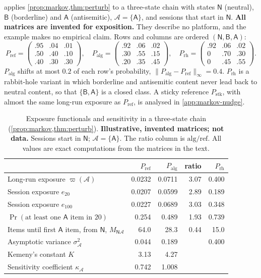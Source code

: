  applies \cref{prop:markov,thm:perturb} to a three-state chain with states $\mathsf N$ (neutral), $\mathsf B$ (borderline) and $\mathsf A$ (antisemitic), $\mathcal A=\{\mathsf A\}$, and sessions that start in $\mathsf N$. \textbf{All matrices are invented for exposition.} They describe no platform, and the example makes no empirical claim. Rows and columns are ordered $(\mathsf N,\mathsf B,\mathsf A)$:
\[
  P_{\mathrm{ref}}=\begin{pmatrix}.95&.04&.01\\.50&.40&.10\\.40&.30&.30\end{pmatrix},\quad
  P_{\mathrm{alg}}=\begin{pmatrix}.92&.06&.02\\.30&.55&.15\\.20&.35&.45\end{pmatrix},\quad
  P_{\mathrm{rh}}=\begin{pmatrix}.92&.06&.02\\0&.70&.30\\0&.45&.55\end{pmatrix}.
\]
$P_{\mathrm{alg}}$ shifts at most $0.2$ of each row's probability, $\|P_{\mathrm{alg}}-P_{\mathrm{ref}}\|_\infty=0.4$. $P_{\mathrm{rh}}$ is a rabbit-hole variant in which borderline and antisemitic content never lead back to neutral content, so that $\{\mathsf B,\mathsf A\}$ is a closed class. A sticky reference $P_{\mathrm{stk}}$, with almost the same long-run exposure as $P_{\mathrm{ref}}$, is analysed in \cref{app:markov-nudge}.

\begin{table}[!htb]
\centering
\caption{Exposure functionals and sensitivity in a three-state chain (\cref{prop:markov,thm:perturb}). \textbf{Illustrative, invented matrices; not data.} Sessions start in $\mathsf N$; $\mathcal A=\{\mathsf A\}$. The ratio column is $\mathrm{alg}/\mathrm{ref}$. All values are exact computations from the matrices in the text.}\label{tab:markov-illus}
\small
\begin{tabular}{@{}l rrr r@{}}
\toprule
 & $P_{\mathrm{ref}}$ & $P_{\mathrm{alg}}$ & ratio & $P_{\mathrm{rh}}$\\
\midrule
Long-run exposure $\varpi(\mathcal A)$ & 0.0232 & 0.0711 & 3.07 & 0.400\\
Session exposure $e_{20}$ & 0.0207 & 0.0599 & 2.89 & 0.189\\
Session exposure $e_{100}$ & 0.0227 & 0.0689 & 3.03 & 0.348\\
$\Pr(\text{at least one } \mathsf A \text{ item in } 20)$ & 0.254 & 0.489 & 1.93 & 0.739\\
Items until first $\mathsf A$ item, from $\mathsf N$, $M_{\mathsf N\mathcal A}$ & 64.0 & 28.3 & 0.44 & 15.0\\
Asymptotic variance $\sigma^2_{\mathcal A}$ & 0.044 & 0.189 & & 0.400\\
Kemeny's constant $K$ & 3.13 & 4.27 & & \\
Sensitivity coefficient $\kappa_{\mathcal A}$ & 0.742 & 1.008 & & \\
\bottomrule
\end{tabular}
\end{table}

